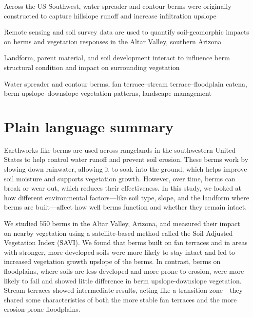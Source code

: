 \documentclass[review]{elsarticle}
\begin{document}
\begin{frontmatter}
\begin{highlights}
\item{Across the US Southwest, water spreader and contour berms were originally constructed to capture hillslope runoff and increase infiltration upslope}  
\item{Remote sensing and soil survey data are used to quantify soil-geomorphic impacts on berms and vegetation responses in the Altar Valley, southern Arizona} 
\item{Landform, parent material, and soil development interact to influence berm structural condition and impact on surrounding vegetation} 
\end{highlights}

\begin{keyword}
Water spreader and contour berms, fan terrace--stream terrace--floodplain catena, berm upslope--downslope vegetation patterns, landscape management  
\end{keyword}

\end{frontmatter}

\linenumbers

\section*{Plain language summary}
Earthworks like berms are used across rangelands in the southwestern United States to help control water runoff and prevent soil erosion. These berms work by slowing down rainwater, allowing it to soak into the ground, which helps improve soil moisture and supports vegetation growth. However, over time, berms can break or wear out, which reduces their effectiveness. In this study, we looked at how different environmental factors—like soil type, slope, and the landform where berms are built—affect how well berms function and whether they remain intact.

We studied 550 berms in the Altar Valley, Arizona, and measured their impact on nearby vegetation using a satellite-based method called the Soil Adjusted Vegetation Index (SAVI). We found that berms built on fan terraces and in areas with stronger, more developed soils were more likely to stay intact and led to increased vegetation growth upslope of the berms. In contrast, berms on floodplains, where soils are less developed and more prone to erosion, were more likely to fail and showed little difference in berm upslope-downslope vegetation. Stream terraces showed intermediate results, acting like a transition zone—they shared some characteristics of both the more stable fan terraces and the more erosion-prone floodplains.
\end{document}
